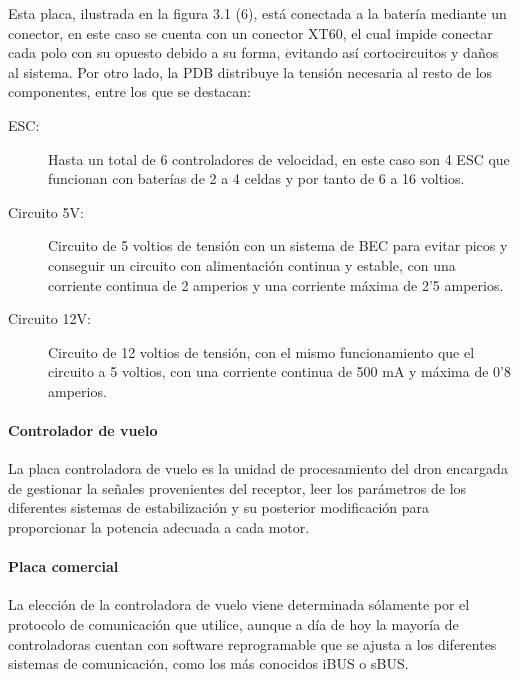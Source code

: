 
Esta placa, ilustrada en la figura 3.1 (6), está conectada a la batería mediante un conector, en este caso se cuenta con un conector XT60, el cual impide conectar cada polo con su opuesto debido a su forma, evitando así cortocircuitos y daños al sistema.
Por otro lado, la PDB distribuye la tensión necesaria al resto de los componentes, entre los que se destacan:


\begin{description}
        \item[ESC:] Hasta un total de 6 controladores de velocidad, en este caso son 4 ESC que funcionan con baterías de 2 a 4 celdas y por tanto de 6 a 16 voltios.
        \item [Circuito 5V:] Circuito de 5 voltios de tensión con un sistema de BEC para evitar picos y conseguir un circuito con alimentación continua y estable, con una corriente continua de 2 amperios y una corriente máxima de 2'5 amperios.
        \item [Circuito 12V:] Circuito de 12 voltios de tensión, con el mismo funcionamiento que el circuito a 5 voltios, con una corriente continua de 500 mA y máxima de 0'8 amperios.
\end{description}


\paragraph{Controlador de vuelo}
\label{SSS:Controlador de vuelo}

	La placa controladora de vuelo es la unidad de procesamiento del dron encargada de gestionar la señales provenientes del receptor, leer los parámetros de los diferentes sistemas de estabilización y su posterior modificación para proporcionar la potencia adecuada a cada motor.
\paragraph{Placa comercial}
\label{SSSS:Placa comercial}
	La elección de la controladora de vuelo viene determinada sólamente por el protocolo de comunicación que utilice, aunque a día de hoy la mayoría de controladoras cuentan con software reprogramable que se ajusta a los diferentes sistemas de comunicación, como los más conocidos iBUS o sBUS.
	
